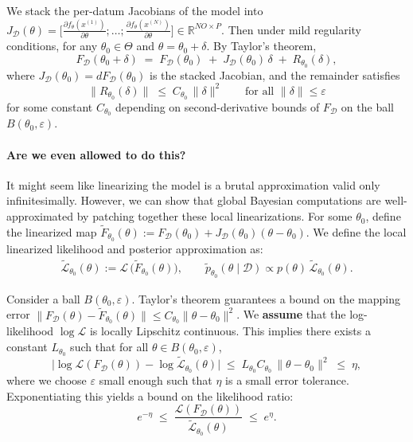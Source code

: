We stack the per-datum Jacobians of the model into $J_{\mathcal{D}}(\theta) = \big[\frac{\partial f_\theta(x^{(1)})}{\partial \theta}; \ldots; \frac{\partial f_\theta(x^{(N)})}{\partial \theta}\big] \in \mathbb{R}^{NO \times P}$. Then under mild regularity conditions, for any \(\theta_0\in\Theta\) and \(\theta=\theta_0+\delta\).
By Taylor's theorem,
\begin{equation}
  F_{\mathcal D}(\theta_0+\delta)
  \;=\;
  F_{\mathcal D}(\theta_0)
  \;+\;
  J_{\mathcal D}(\theta_0)\,\delta
  \;+\;
  R_{\theta_0}(\delta),
  \label{eq:taylor_F}
\end{equation}
where \(J_{\mathcal D}(\theta_0)=dF_{\mathcal D}(\theta_0)\) is the stacked Jacobian, and the remainder satisfies
\[
  \|R_{\theta_0}(\delta)\|
  \;\le\;
  C_{\theta_0}\,\|\delta\|^2
  \qquad \text{for all }\|\delta\|\le \varepsilon
\]
for some constant \(C_{\theta_0}\) depending on second-derivative bounds of \(F_{\mathcal D}\) on the ball
\(B(\theta_0,\varepsilon)\).

\paragraph{Are we even allowed to do this?}
It might seem like linearizing the model is a brutal approximation valid only infinitesimally. However, we can show that global Bayesian computations are well-approximated by patching together these local linearizations.
For some $\theta_0$, define the linearized map $\widetilde F_{\theta_0}(\theta):=F_{\mathcal D}(\theta_0)+J_{\mathcal D}(\theta_0)(\theta-\theta_0)$.
We define the local linearized likelihood and posterior approximation as:
\begin{align}
    \widetilde{\mathcal L}_{\theta_0}(\theta):=\mathcal L\,\bigl(\widetilde F_{\theta_0}(\theta)\bigr),
\qquad
\widetilde p_{\theta_0}(\theta\mid\mathcal D)\propto p(\theta)\,\widetilde{\mathcal L}_{\theta_0}(\theta).
\end{align}

Consider a ball $B(\theta_0,\varepsilon)$. Taylor's theorem guarantees a bound on the mapping error $\|F_{\mathcal D}(\theta)-\widetilde F_{\theta_0}(\theta)\|\le C_{\theta_0}\|\theta-\theta_0\|^2$.
We \textbf{assume} that the log-likelihood $\log\mathcal L$ is locally Lipschitz continuous.
This implies there exists a constant $L_{\theta_0}$ such that for all $\theta\in B(\theta_0,\varepsilon)$,
\begin{equation}
\label{eq:loglik_bound_ball}
\bigl|\log \mathcal L(F_{\mathcal D}(\theta))-\log \widetilde{\mathcal L}_{\theta_0}(\theta)\bigr|
\;\le\; L_{\theta_0}C_{\theta_0}\,\|\theta-\theta_0\|^2
\;\le\; \eta,
\end{equation}
where we choose $\varepsilon$ small enough such that $\eta$ is a small error tolerance.
Exponentiating this yields a bound on the likelihood ratio:
\begin{equation}
\label{eq:lik_ratio_ball}
e^{-\eta}\;\le\;\frac{\mathcal L(F_{\mathcal D}(\theta))}{\widetilde{\mathcal L}_{\theta_0}(\theta)}\;\le\;e^{\eta}.
\end{equation}

